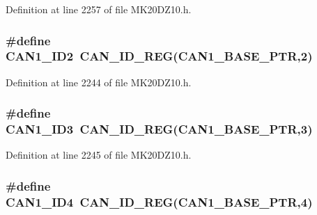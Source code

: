 Definition at line 2257 of file M\+K20\+D\+Z10.\+h.

\subsubsection[{\texorpdfstring{C\+A\+N1\+\_\+\+I\+D2}{CAN1_ID2}}]{\setlength{\rightskip}{0pt plus 5cm}\#define C\+A\+N1\+\_\+\+I\+D2~{\bf C\+A\+N\+\_\+\+I\+D\+\_\+\+R\+EG}({\bf C\+A\+N1\+\_\+\+B\+A\+S\+E\+\_\+\+P\+TR},2)}\hypertarget{group___c_a_n___register___accessor___macros_ga4ba8f798301875fed2e307b7e21f50df}{}\label{group___c_a_n___register___accessor___macros_ga4ba8f798301875fed2e307b7e21f50df}


Definition at line 2244 of file M\+K20\+D\+Z10.\+h.

\subsubsection[{\texorpdfstring{C\+A\+N1\+\_\+\+I\+D3}{CAN1_ID3}}]{\setlength{\rightskip}{0pt plus 5cm}\#define C\+A\+N1\+\_\+\+I\+D3~{\bf C\+A\+N\+\_\+\+I\+D\+\_\+\+R\+EG}({\bf C\+A\+N1\+\_\+\+B\+A\+S\+E\+\_\+\+P\+TR},3)}\hypertarget{group___c_a_n___register___accessor___macros_ga430b31ee33e54c912da0902e6c164330}{}\label{group___c_a_n___register___accessor___macros_ga430b31ee33e54c912da0902e6c164330}


Definition at line 2245 of file M\+K20\+D\+Z10.\+h.

\subsubsection[{\texorpdfstring{C\+A\+N1\+\_\+\+I\+D4}{CAN1_ID4}}]{\setlength{\rightskip}{0pt plus 5cm}\#define C\+A\+N1\+\_\+\+I\+D4~{\bf C\+A\+N\+\_\+\+I\+D\+\_\+\+R\+EG}({\bf C\+A\+N1\+\_\+\+B\+A\+S\+E\+\_\+\+P\+TR},4)}\hypertarget{group___c_a_n___register___accessor___macros_ga659b5028f04875ea06edf0d6b0767efb}{}\label{group___c_a_n___register___accessor___macros_ga659b5028f04875ea06edf0d6b0767efb}


